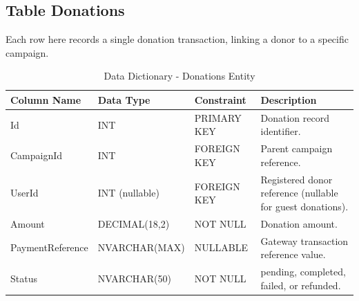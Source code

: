 \documentclass{thesis-library}
\begin{document}
\subsection{Table Donations}
{\RaggedRight
Each row here records a single donation transaction, linking a donor to a specific campaign.\par}
\begin{table}[H]
    \centering
    \caption{Data Dictionary - Donations Entity}
    \vspace{10pt}
    \begin{tabularx}{\linewidth}{|l|l|l|L|}
        \hline
        \textbf{Column Name} & \textbf{Data Type} & \textbf{Constraint} & \textbf{Description} \\
        \hline
        Id & INT & PRIMARY KEY & Donation record identifier. \\
        \hline
        CampaignId & INT & FOREIGN KEY & Parent campaign reference. \\
        \hline
        UserId & INT (nullable) & FOREIGN KEY & Registered donor reference (nullable for guest donations). \\
        \hline
        Amount & DECIMAL(18,2) & NOT NULL & Donation amount. \\
        \hline
        PaymentReference & NVARCHAR(MAX) & NULLABLE & Gateway transaction reference value. \\
        \hline
        Status & NVARCHAR(50) & NOT NULL & pending, completed, failed, or refunded. \\
        \hline
    \end{tabularx}
\end{table}
\end{document}
